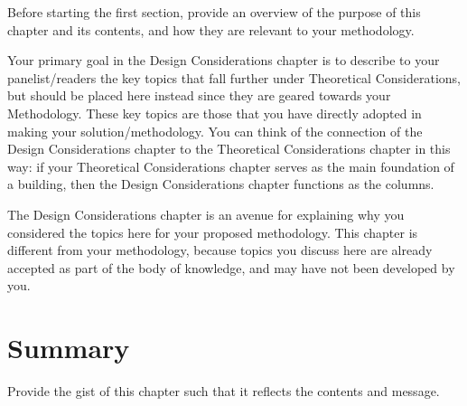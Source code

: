 Before starting the first section, provide an overview of the purpose of this chapter and its contents, and how they are relevant to your methodology. 

Your primary goal in the Design Considerations chapter is to describe to your panelist/readers the key topics that fall further under Theoretical Considerations, but should be placed here instead since they are geared towards your Methodology. These key topics are those that you have directly adopted in making your solution/methodology.  You can think of the connection of the Design Considerations chapter to the Theoretical Considerations chapter in this way: if your Theoretical Considerations chapter serves as the main foundation of a building, then the Design Considerations chapter functions as the columns. 

The  Design Considerations chapter is an avenue for explaining why you considered the topics here for your proposed methodology. This chapter is different from your methodology, because topics you discuss here are already accepted as part of the body of knowledge, and may have not been developed by you.  


\graytx{\Blindtext}


\section{Summary}

Provide the gist of this chapter such that it reflects the contents and message.